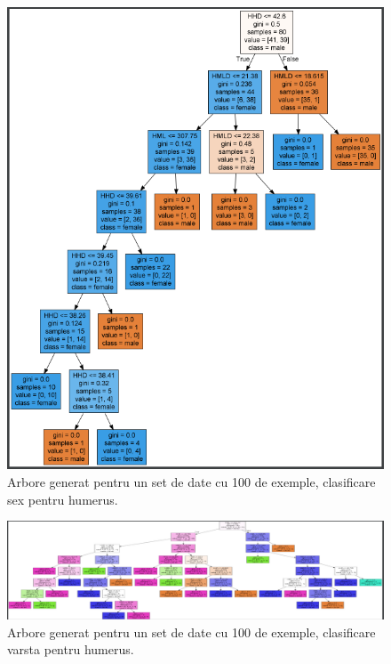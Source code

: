 \documentclass[runningheads,a4paper,11pt]{report}
\begin{document}
\begin{figure}
\centerline{\includegraphics{Imagini/tree_sex_humerus_100.PNG}}
\caption{Arbore generat pentru un set de date cu 100 de exemple, clasificare sex pentru humerus.}
\label{fig}
\end{figure}

\begin{figure}
\centerline{\includegraphics[width=20cm,keepaspectratio]{Imagini/tree_age_humerus_100.png}}
\caption{Arbore generat pentru un set de date cu 100 de exemple, clasificare varsta pentru humerus.}
\label{fig}
\end{figure}
\end{document}
